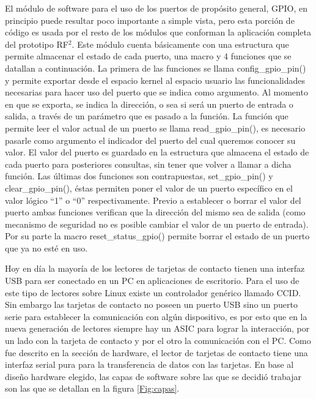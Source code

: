 El módulo de software para el uso de los puertos de propósito general, GPIO, en principio puede resultar poco importante a simple vista, pero esta porción de código es usada por el resto de los módulos que conforman la aplicación completa del prototipo RF$^{2}$. 
Este módulo cuenta básicamente con una estructura que permite almacenar el estado de cada puerto, una macro y 4 funciones que se datallan a continuación.
La primera de las funciones se llama config\_gpio\_pin() y permite exportar desde el espacio kernel al espacio usuario las funcionalidades necesarias para hacer uso del puerto que se indica como argumento. Al momento en que se exporta, se indica la dirección, o sea si será un puerto de entrada o salida, a través de un parámetro que es pasado a la función.
La función que permite leer el valor actual de un puerto se llama read\_gpio\_pin(), es necesario pasarle como argumento el indicador del puerto del cual queremos conocer su valor. El valor del puerto es guardado en la estructura que almacena el estado de cada puerto para posteriores consultas, sin tener que volver a llamar a dicha función.
Las últimas dos funciones son contrapuestas, set\_gpio\_pin() y clear\_gpio\_pin(), éstas permiten poner el valor de un puerto específico en el valor lógico “1” o “0” respectivamente. Previo a establecer o borrar el valor del puerto ambas funciones verifican que la dirección del mismo sea de salida (como mecanismo de seguridad no es posible cambiar el valor de un puerto de entrada).
Por su parte la macro reset\_status\_gpio() permite borrar el estado de un puerto que ya no esté en uso.

\bigskip
{}

Hoy en día la mayoría de los lectores de tarjetas de contacto tienen una interfaz USB para ser conectado en un PC en aplicaciones de escritorio. Para el uso de este tipo de lectores sobre Linux existe un controlador genérico llamado CCID.
Sin embargo las tarjetas de contacto no poseen un puerto USB sino un puerto serie para establecer la comunicación con algún dispositivo, es por esto que en la nueva generación de lectores siempre hay un  ASIC para lograr la interacción, por un lado con la tarjeta de contacto y por el otro la comunicación con el PC.
Como fue descrito en la sección de hardware, el lector de tarjetas de contacto tiene una interfaz serial pura para la transferencia de datos con las tarjetas. En base al diseño hardware elegido, las capas de software sobre las que se decidió trabajar son las que se detallan en la figura \ref{Fig:capas}. 

